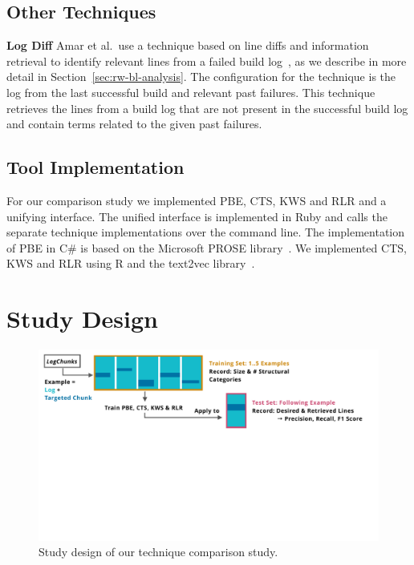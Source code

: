 \subsection{Other Techniques}

\noindent
\textbf{Log Diff}
Amar et al.\ use a technique based on line diffs and information
retrieval to identify relevant lines from a failed build
log~\cite{amar2019mining}, as we describe in more detail in
Section~\ref{sec:rw-bl-analysis}. The configuration for the technique
is the log from the last successful build and relevant past failures.
This technique retrieves the lines from a build log that are not
present in the successful build log and contain terms related to the
given past failures.


\subsection{Tool Implementation}
For our comparison study we implemented PBE, CTS, KWS and RLR and a
unifying interface. The unified interface is implemented in Ruby and
calls the separate technique implementations over the command line.
The implementation of PBE in C\# is based on the Microsoft PROSE
library~\cite{prose2019webpage}. We implemented CTS, KWS and RLR using
R and the text2vec library~\cite{text2vec2019webpage}.


\section{Study Design}
\label{sec:study}

\begin{figure}[tb]
	\centering
	\includegraphics[width=\textwidth, trim={0.4cm 8.4cm 1.2cm 0.3cm}, clip]{img/study.pdf}
	\caption{Study design of our technique comparison study.}
	\label{fig:study}
\end{figure}

